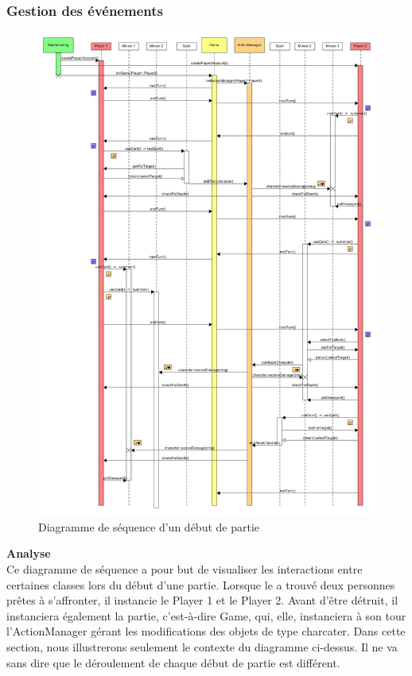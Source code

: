 \subsubsection{Gestion des événements}
\begin{figure}[H]
    \includegraphics[width=1\textwidth,height=1.35\textwidth]{Images/Sequence-Diagram.jpg}
    \caption{\label{Sequence Diagram Partie} Diagramme de séquence d'un début de partie}
\end{figure}
\noindent\textbf{Analyse}\\
Ce diagramme de séquence a pour but de visualiser les interactions entre certaines classes lors du début d'une partie. Lorsque le  a trouvé deux personnes prêtes à s'affronter, il instancie le Player 1 et le Player 2. Avant d'être détruit, il instanciera également la partie, c'est-à-dire Game, qui, elle, instanciera à son tour l'ActionManager gérant les modifications des objets de type charcater. Dans cette section, nous illustrerons seulement le contexte du diagramme ci-dessus. Il ne va sans dire que le déroulement de chaque début de partie est différent.\\
